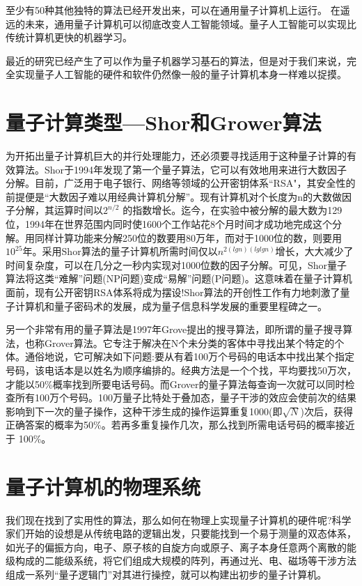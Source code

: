 \documentclass{hfutpaper}
\begin{document}
至少有50种其他独特的算法已经开发出来，可以在通用量子计算机上运行。
在遥远的未来，通用量子计算机可以彻底改变人工智能领域。量子人工智能可以实现比传统计算机更快的机器学习。

最近的研究已经产生了可以作为量子机器学习基石的算法，但是对于我们来说，完全实现量子人工智能的硬件和软件仍然像一般的量子计算机本身一样难以捉摸。

\section{量子计算类型---Shor和Grower算法}

为开拓出量子计算机巨大的并行处理能力，还必须要寻找适用于这种量子计算的有效算法。Shor于1994年发现了第一个量子算法，它可以有效地用来进行大数因子分解。目前，广泛用于电子银行、网络等领域的公开密钥体系“RSA"，其安全性的前提便是“大数因子难以用经典计算机分解”。现有计算机对个长度为n的大数做因子分解，其运算时间以$2^{n/2}$
的指数增长。迄今，在实验中被分解的最大数为129位，1994年在世界范围内同时使1600个工作站花8个月时间才成功地完成这个分解。用同样计算功能来分解250位的数要用80万年，而对于1000位的数，则要用$10^{25}$年。采用Shor算法的量子计算机所需时间仅以$n^{2(lgn)(lglgn)}$增长，大大减少了时间复杂度，可以在几分之一秒内实现对1000位数的因子分解。可见，Shor量子算法将这类“难解”问题(NP问题)变成“易解”问题(P问题)。这意味着在量子计算机面前，现有公开密钥RSA体系将成为摆设!Shor算法的开创性工作有力地刺激了量子计算机和量子密码术的发展，成为量子信息科学发展的重要里程碑之一。

另一个非常有用的量子算法是1997年Grove提出的搜寻算法，即所谓的量子搜寻算法，也称Grover算法。它专注于解决在N个未分类的客体中寻找出某个特定的个体。通俗地说，它可解决如下问题:要从有着100万个号码的电话本中找出某个指定号码，该电话本是以姓名为顺序编排的。经典方法是一个个找，平均要找50万次，才能以50\%概率找到所要电话号码。而Grover的量子算法每查询一次就可以同时检查所有100万个号码。100万量子比特处于叠加态，量子干涉的效应会使前次的结果影响到下一次的量子操作，这种干涉生成的操作运算重复1000(即$\sqrt{N}$)次后，获得正确答案的概率为50\%。若再多重复操作几次，那么找到所需电话号码的概率接近于
100\%。

\section{量子计算机的物理系统}

我们现在找到了实用性的算法，那么如何在物理上实现量子计算机的硬件呢?科学家们开始的设想是从传统电路的逻辑出发，只要能找到一个易于测量的双态体系，如光子的偏振方向，电子、原子核的自旋方向或原子、离子本身任意两个离散的能级构成的二能级系统，将它们组成大规模的阵列，再通过光、电、磁场等干涉方法组成一系列“量子逻辑门”对其进行操控，就可以构建出初步的量子计算机。
\end{document}
